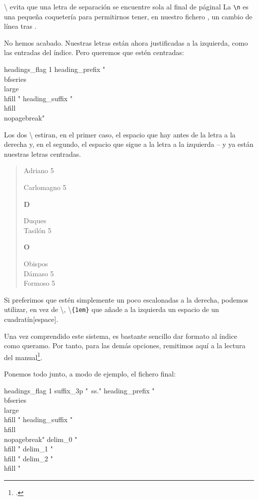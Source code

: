 \textbackslash{} evita que una letra de separación se encuentre sola al final de páginal La \verb|\n| es una pequeña coquetería para permitirnos tener, en nuestro fichero , un cambio de línea tras .



No hemos acabado. Nuestras letras están ahora justificadas a la izquierda, como las entradas del índice. Pero queremos que estén centradas: 

\begin{latexcode}
headings_flag 1
heading_prefix " {\\bfseries\\large\\hfill " 
heading_suffix " \\hfill}\\nopagebreak\n " 
\end{latexcode}

Los dos \textbackslash{} estiran, en el primer caso, el espacio que hay antes de la letra a la derecha y, en el segundo, el espacio que sigue a la letra a la izquierda -- y ya están nuestras letras centradas.

\begin{quotation}
\parindent=0pt
\addtolength{\parskip}{\baselineskip}
Adriano \hfill 5 


Carlomagno \hfill 5 

{\hfill\large{\textbf{D}}\hfill}

Duques \\
\hspace*{1em} Tasilón \hfill 5

{\hfill\large{\textbf{O}}\hfill}

Obispos \\
\hspace*{1em} Dámaso \hfill 5\\
\hspace*{1em} Formoso \hfill  5
\end{quotation}


Si preferimos que estén simplemente un poco escalonadas a la derecha, podemos utilizar, en vez de \textbackslash{}, \textbackslash{}\verb|{1em}| que añade a la izquierda un espacio de un cuadratín[espace].


Una vez comprendido este sistema, es bastante sencillo dar formato al índice como queramo. Por tanto, para las demás opciones, remitimos aquí a la lectura del manual\footcite[También se puede consultar][]{frama_index}. 

Ponemos todo junto, a modo de ejemplo, el fichero final:

\begin{latexcode}
headings_flag 1
suffix_3p "~ss."
heading_prefix " {\\bfseries\\large\\hfill " 
heading_suffix " \\hfill}\\nopagebreak\n " 
delim_0 "\\hfill "
delim_1 "\\hfill "
delim_2 "\\hfill "
\end{latexcode}




